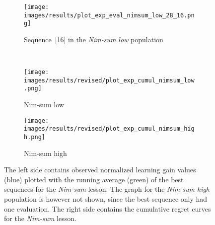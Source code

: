 \begin{figure}[ht]
	\begin{subfigure}{0.9\linewidth}
	\texttt{[image: images/results/plot\_exp\_eval\_nimsum\_low\_28\_16.png]}
	\caption{Sequence~[16] in the \emph{Nim-sum low} population}
	\label{fig:exp_eval_nimsum_low_28}
	\end{subfigure}\\
	\begin{subfigure}{0.45\linewidth}
	\texttt{[image: images/results/revised/plot\_exp\_cumul\_nimsum\_low.png]}
	\caption{Nim-sum low}
	\label{fig:exp_cumul_nimsum_low}
	\end{subfigure}
	\hfill
	\begin{subfigure}{0.45\linewidth}
	\texttt{[image: images/results/revised/plot\_exp\_cumul\_nimsum\_high.png]}
	\caption{Nim-sum high}
	\label{fig:exp_cumul_nimsum_high}
	\end{subfigure}
	\caption[Evaluations of best sequences and cumulative regret in
	Nim-sum]{The left side contains observed normalized learning gain values
		(blue) plotted with the running average (green) of the best sequences
		for the \emph{Nim-sum} lesson. The graph for the \emph{Nim-sum high}
		population is however not shown, since the best sequence only had one
		evaluation. The right side contains the cumulative
		regret curves for the \emph{Nim-sum} lesson.}
	\label{fig:exp_eval_nimsum}
\end{figure}

